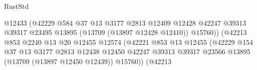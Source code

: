\begin{lexlean}{RustStd}
\begin{coremodule}
                                                    @12433
                                                    (@42229
                                                      @584
                                                      @37
                                                      @13
                                                      @3177
                                                      @2813
                                                      @12409
                                                      @12428
                                                      @42247
                                                      @39313
                                                      @39317
                                                      @23495
                                                      @13895
                                                      (@13709 (@13897 @12428 @12410))
                                                      @15760))
                                                  (@42213
                                                    @853
                                                    @2240
                                                    @13
                                                    @20
                                                    @12455
                                                    @12574
                                                    (@42221
                                                      @853
                                                      @13
                                                      @12455
                                                      (@42229
                                                        @154
                                                        @37
                                                        @13
                                                        @3177
                                                        @2813
                                                        @12438
                                                        @12450
                                                        @42247
                                                        @39313
                                                        @39317
                                                        @23566
                                                        @13895
                                                        (@13709 (@13897 @12450 @12439))
                                                        @15760))
                                                    (@42213

\end{coremodule}
\end{lexlean}

